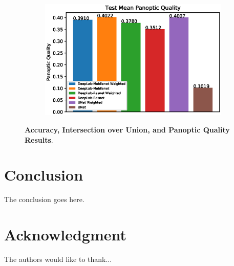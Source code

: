 \documentclass[journal]{IEEEtran}
\begin{document}
\begin{figure}
\begin{subfigure}[b]{\linewidth}
\end{subfigure}
\begin{subfigure}[b]{\linewidth}
\includegraphics[width=\linewidth]{graphs/Test-Mean-Panoptic-Quality.eps}
\end{subfigure}
\caption{\textbf{Accuracy, Intersection over Union, and Panoptic Quality Results}.}
\label{fig:graph_results}
\end{figure}
\section{Conclusion}
The conclusion goes here.


\section*{Acknowledgment}


The authors would like to thank...


\ifCLASSOPTIONcaptionsoff
  \newpage
\fi





%


%




\end{document}
